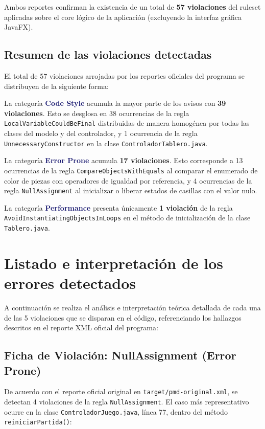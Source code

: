 \documentclass[12pt,a4paper]{article}
\newcommand{\key}[1]{\textbf{\textcolor{MidnightBlue}{#1}}}
\begin{document}
Ambos reportes confirman la existencia de un total de \textbf{57 violaciones} del ruleset aplicadas sobre el core lógico de la aplicación (excluyendo la interfaz gráfica JavaFX).

\subsection{Resumen de las violaciones detectadas}

El total de 57 violaciones arrojadas por los reportes oficiales del programa se distribuyen de la siguiente forma:

La categoría \key{Code Style} acumula la mayor parte de los avisos con \textbf{39 violaciones}. Esto se desglosa en 38 ocurrencias de la regla \texttt{LocalVariableCouldBeFinal} distribuidas de manera homogénea por todas las clases del modelo y del controlador, y 1 ocurrencia de la regla \texttt{UnnecessaryConstructor} en la clase \texttt{ControladorTablero.java}.

La categoría \key{Error Prone} acumula \textbf{17 violaciones}. Esto corresponde a 13 ocurrencias de la regla \texttt{CompareObjectsWithEquals} al comparar el enumerado de color de piezas con operadores de igualdad por referencia, y 4 ocurrencias de la regla \texttt{NullAssignment} al inicializar o liberar estados de casillas con el valor nulo.

La categoría \key{Performance} presenta únicamente \textbf{1 violación} de la regla \texttt{AvoidInstantiatingObjectsInLoops} en el método de inicialización de la clase \texttt{Tablero.java}.

\section{Listado e interpretación de los errores detectados}

A continuación se realiza el análisis e interpretación teórica detallada de cada una de las 5 violaciones que se disparan en el código, referenciando los hallazgos descritos en el reporte XML oficial del programa:

\subsection{Ficha de Violación: NullAssignment (Error Prone)}

De acuerdo con el reporte oficial original en \texttt{target/pmd-original.xml}, se detectan 4 violaciones de la regla \texttt{NullAssignment}. El caso más representativo ocurre en la clase \texttt{ControladorJuego.java}, línea 77, dentro del método \texttt{reiniciarPartida()}:
\end{document}
